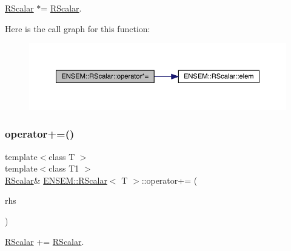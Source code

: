 \mbox{\hyperlink{classENSEM_1_1RScalar}{R\+Scalar}} $\ast$= \mbox{\hyperlink{classENSEM_1_1RScalar}{R\+Scalar}}. 

Here is the call graph for this function\+:
\nopagebreak
\begin{figure}[H]
\begin{center}
\leavevmode
\includegraphics[width=350pt]{d0/d8c/classENSEM_1_1RScalar_a4e8f4b8988a47a5e5eef56424d0e23d9_cgraph}
\end{center}
\end{figure}
\mbox{\label{classENSEM_1_1RScalar_adc6bf2610b8af0ab175ef00d9194aa1d}} 
\subsubsection{\texorpdfstring{operator+=()}{operator+=()}\hspace{0.1cm}{\footnotesize\ttfamily [1/3]}}
{\footnotesize\ttfamily template$<$class T $>$ \\
template$<$class T1 $>$ \\
\mbox{\hyperlink{classENSEM_1_1RScalar}{R\+Scalar}}\& \mbox{\hyperlink{classENSEM_1_1RScalar}{E\+N\+S\+E\+M\+::\+R\+Scalar}}$<$ T $>$\+::operator+= (\begin{DoxyParamCaption}\item[{const \mbox{\hyperlink{classENSEM_1_1RScalar}{R\+Scalar}}$<$ T1 $>$ \&}]{rhs }\end{DoxyParamCaption})\hspace{0.3cm}{\ttfamily [inline]}}



\mbox{\hyperlink{classENSEM_1_1RScalar}{R\+Scalar}} += \mbox{\hyperlink{classENSEM_1_1RScalar}{R\+Scalar}}. 


